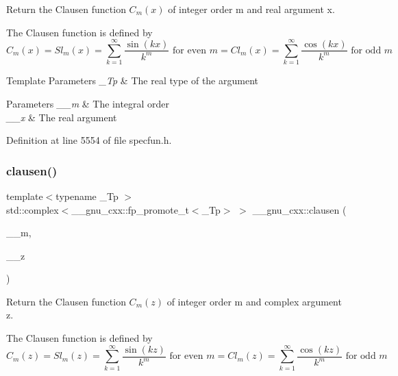 Return the Clausen function $ C_m(x) $ of integer order {\ttfamily m} and real argument {\ttfamily x}.

The Clausen function is defined by \[ C_m(x) = Sl_m(x) = \sum_{k=1}^\infty\frac{\sin(kx)}{k^m} \mbox{ for even } m = Cl_m(x) = \sum_{k=1}^\infty\frac{\cos(kx)}{k^m} \mbox{ for odd } m \]


\begin{DoxyTemplParams}{Template Parameters}
{\em \+\_\+\+Tp} & The real type of the argument \\
\hline
\end{DoxyTemplParams}

\begin{DoxyParams}{Parameters}
{\em \+\_\+\+\_\+m} & The integral order \\
\hline
{\em \+\_\+\+\_\+x} & The real argument \\
\hline
\end{DoxyParams}


Definition at line 5554 of file specfun.\+h.

\mbox{\label{group__mathsf__gnu_gaf7c4317ef6bfd3a4bf0ddcba22ee7588}} 
\subsubsection{\texorpdfstring{clausen()}{clausen()}\hspace{0.1cm}{\footnotesize\ttfamily [2/2]}}
{\footnotesize\ttfamily template$<$typename \+\_\+\+Tp $>$ \\
std\+::complex$<$\+\_\+\+\_\+gnu\+\_\+cxx\+::fp\+\_\+promote\+\_\+t$<$\+\_\+\+Tp$>$ $>$ \+\_\+\+\_\+gnu\+\_\+cxx\+::clausen (\begin{DoxyParamCaption}\item[{unsigned int}]{\+\_\+\+\_\+m,  }\item[{std\+::complex$<$ \+\_\+\+Tp $>$}]{\+\_\+\+\_\+z }\end{DoxyParamCaption})\hspace{0.3cm}{\ttfamily [inline]}}

Return the Clausen function $ C_m(z) $ of integer order {\ttfamily m} and complex argument {\ttfamily z}.

The Clausen function is defined by \[ C_m(z) = Sl_m(z) = \sum_{k=1}^\infty\frac{\sin(kz)}{k^m} \mbox{ for even } m = Cl_m(z) = \sum_{k=1}^\infty\frac{\cos(kz)}{k^m} \mbox{ for odd } m \]


